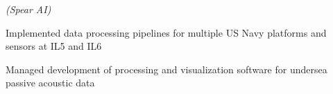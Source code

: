  \emph{(Spear AI)}
\begin{subenum}
\item Implemented data processing pipelines for multiple US Navy platforms and
  sensors at IL5 and IL6
\item Managed development of processing and visualization software for undersea
  passive acoustic data
\end{subenum}

